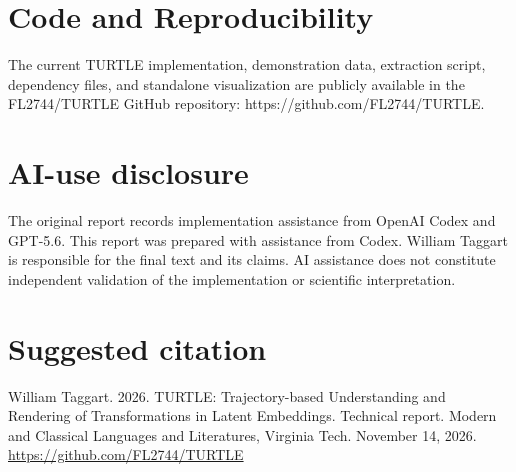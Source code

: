 \documentclass[manuscript,screen,nonacm]{acmart}
\begin{document}
\section{Code and Reproducibility}\label{code-and-reproducibility}

The current TURTLE implementation, demonstration data, extraction script, dependency files, and standalone visualization are publicly available in the FL2744/TURTLE GitHub repository: https://github.com/FL2744/TURTLE.
\nocite{taggart}

\section*{AI-use disclosure}
The original report records implementation assistance from OpenAI Codex and GPT-5.6. This report was prepared with assistance from Codex. William Taggart is responsible for the final text and its claims. AI assistance does not constitute independent validation of the implementation or scientific interpretation.

\enlargethispage{2\baselineskip}



\section*{Suggested citation}
William Taggart. 2026. TURTLE: Trajectory-based Understanding and Rendering of Transformations in Latent Embeddings. Technical report. Modern and Classical Languages and Literatures, Virginia Tech. November 14, 2026. \url{https://github.com/FL2744/TURTLE}
\end{document}
